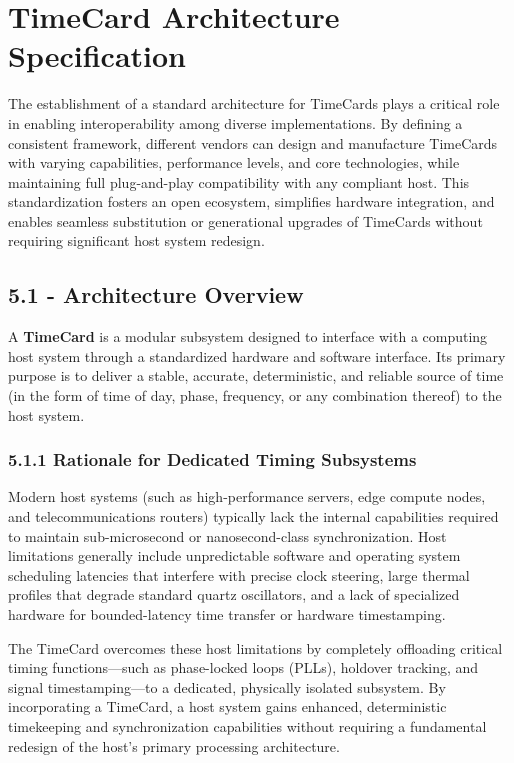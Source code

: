 \documentclass[
]{article}
\begin{document}
\section{TimeCard Architecture
Specification}\label{timecard-architecture-specification}

The establishment of a standard architecture for TimeCards plays a
critical role in enabling interoperability among diverse
implementations. By defining a consistent framework, different vendors
can design and manufacture TimeCards with varying capabilities,
performance levels, and core technologies, while maintaining full
plug-and-play compatibility with any compliant host. This
standardization fosters an open ecosystem, simplifies hardware
integration, and enables seamless substitution or generational upgrades
of TimeCards without requiring significant host system redesign.

\subsection{5.1 - Architecture Overview}\label{architecture-overview}

A \textbf{TimeCard} is a modular subsystem designed to interface with a
computing host system through a standardized hardware and software
interface. Its primary purpose is to deliver a stable, accurate,
deterministic, and reliable source of time (in the form of time of day,
phase, frequency, or any combination thereof) to the host system.

\subsubsection{5.1.1 Rationale for Dedicated Timing
Subsystems}\label{rationale-for-dedicated-timing-subsystems}

Modern host systems (such as high-performance servers, edge compute
nodes, and telecommunications routers) typically lack the internal
capabilities required to maintain sub-microsecond or nanosecond-class
synchronization. Host limitations generally include unpredictable
software and operating system scheduling latencies that interfere with
precise clock steering, large thermal profiles that degrade standard
quartz oscillators, and a lack of specialized hardware for
bounded-latency time transfer or hardware timestamping.

The TimeCard overcomes these host limitations by completely offloading
critical timing functions---such as phase-locked loops (PLLs), holdover
tracking, and signal timestamping---to a dedicated, physically isolated
subsystem. By incorporating a TimeCard, a host system gains enhanced,
deterministic timekeeping and synchronization capabilities without
requiring a fundamental redesign of the host's primary processing
architecture.
\end{document}
